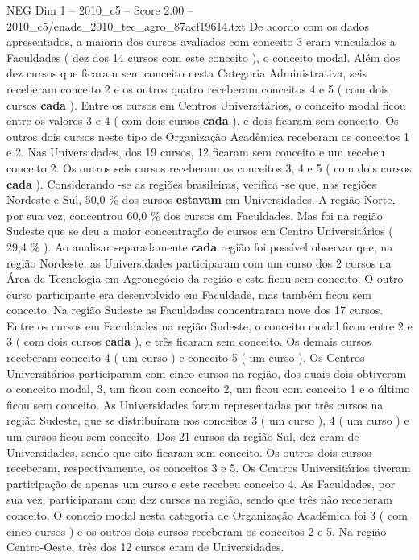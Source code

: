 \begin{textsample}{NEG Dim 1 – 2010\_c5 – Score 2.00 – 2010\_c5/enade\_2010\_tec\_agro\_87acf19614.txt}
De acordo com os dados apresentados, a maioria dos cursos avaliados com conceito 3 eram vinculados a Faculdades ( dez dos 14 cursos com este conceito ), o conceito modal.
Além dos dez cursos que ficaram sem conceito nesta Categoria Administrativa, seis receberam conceito 2 e os outros quatro receberam conceitos 4 e 5 ( com dois cursos \textbf{cada} ).
Entre os cursos em Centros Universitários, o conceito modal ficou entre os valores 3 e 4 ( com dois cursos \textbf{cada} ), e dois ficaram sem conceito.
Os outros dois cursos neste tipo de Organização Acadêmica receberam os conceitos 1 e 2.
Nas Universidades, dos 19 cursos, 12 ficaram sem conceito e um recebeu conceito 2.
Os outros seis cursos receberam os conceitos 3, 4 e 5 ( com dois cursos \textbf{cada} ).
Considerando -se as regiões brasileiras, verifica -se que, nas regiões Nordeste e Sul, 50,0 \% dos cursos \textbf{estavam} em Universidades.
A região Norte, por sua vez, concentrou 60,0 \% dos cursos em Faculdades.
Mas foi na região Sudeste que se deu a maior concentração de cursos em Centro Universitários ( 29,4 \% ).
Ao analisar separadamente \textbf{cada} região foi possível observar que, na região Nordeste, as Universidades participaram com um curso dos 2 cursos na Área de Tecnologia em Agronegócio da região e este ficou sem conceito.
O outro curso participante era desenvolvido em Faculdade, mas também ficou sem conceito.
Na região Sudeste as Faculdades concentraram nove dos 17 cursos.
Entre os cursos em Faculdades na região Sudeste, o conceito modal ficou entre 2 e 3 ( com dois cursos \textbf{cada} ), e três ficaram sem conceito.
Os demais cursos receberam conceito 4 ( um curso ) e conceito 5 ( um curso ).
Os Centros Universitários participaram com cinco cursos na região, dos quais dois obtiveram o conceito modal, 3, um ficou com conceito 2, um ficou com conceito 1 e o último ficou sem conceito.
As Universidades foram representadas por três cursos na região Sudeste, que se distribuíram nos conceitos 3 ( um curso ), 4 ( um curso ) e um cursos ficou sem conceito.
Dos 21 cursos da região Sul, dez eram de Universidades, sendo que oito ficaram sem conceito.
Os outros dois cursos receberam, respectivamente, os conceitos 3 e 5.
Os Centros Universitários tiveram participação de apenas um curso e este recebeu conceito 4.
As Faculdades, por sua vez, participaram com dez cursos na região, sendo que três não receberam conceito.
O conceio modal nesta categoria de Organização Acadêmica foi 3 ( com cinco cursos ) e os outros dois cursos receberam os conceitos 2 e 5.
Na região Centro-Oeste, três dos 12 cursos eram de Universidades.

\end{textsample}
